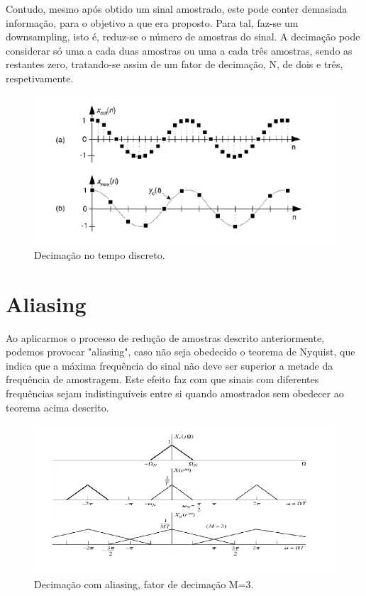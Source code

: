\documentclass{article}
\begin{document}
    Contudo, mesmo após obtido um sinal amostrado, este pode conter demasiada informação, para o objetivo a que era proposto. Para tal, faz-se um downsampling, isto é, reduz-se o número de amostras do sinal. A decimação pode considerar só uma a cada duas amostras ou uma a cada três amostras, sendo as restantes zero, tratando-se assim de um fator de decimação, N, de dois e três, respetivamente.\\  
    
\begin{figure}[h!]
\centering
\includegraphics[scale=0.5]{matlab_test_images/outras_imgs/decimation_time.PNG}
\caption{Decimação no tempo discreto.}
\label{fig:matlab_test_images/outras_imgs/decimation_time}
\end{figure}   

\section{Aliasing}

    Ao aplicarmos o processo de redução de amostras descrito anteriormente, podemos provocar "aliasing", caso não seja obedecido o teorema de Nyquist, que indica que a máxima frequência do sinal não deve ser superior a metade da frequência de amostragem. Este efeito faz com que sinais com diferentes frequências sejam indistinguíveis entre si quando amostrados sem obedecer ao teorema acima descrito.\\
    
\begin{figure}[h!]
\centering
\includegraphics[scale=0.5]{matlab_test_images/outras_imgs/decimacao_aliasing.PNG}
\caption{Decimação com aliasing, fator de decimação M=3.}
\label{fig:matlab_test_images/outras_imgs/decimacao_aliasing}
\end{figure}      
    
\end{document}
